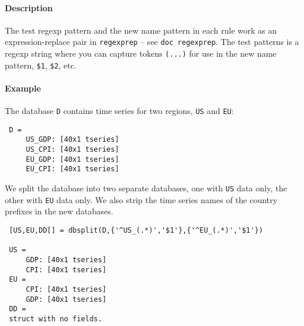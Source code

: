  \paragraph{Description}
 
 The test regexp pattern and the new name pattern in each rule work as an
 expression-replace pair in \texttt{regexprep} -- see
 \texttt{doc regexprep}. The test patterns is a regexp string where you
 can capture tokens \texttt{(...)} for use in the new name pattern,
 \texttt{\$1}, \texttt{\$2}, etc.
 
 \paragraph{Example}
 
 The database \texttt{D} contains time series for two regions,
 \texttt{US} and \texttt{EU}:
 
 \begin{verbatim}
 D = 
     US_GDP: [40x1 tseries]
     US_CPI: [40x1 tseries]
     EU_GDP: [40x1 tseries]
     EU_CPI: [40x1 tseries]
 \end{verbatim}
 
 We split the database into two separate databases, one with \texttt{US}
 data only, the other with \texttt{EU} data only. We also strip the time
 series names of the country prefixes in the new databases.
 
 \begin{verbatim}
 [US,EU,DD[] = dbsplit(D,{'^US_(.*)','$1'},{'^EU_(.*)','$1'})
 
 US = 
     GDP: [40x1 tseries]
     CPI: [40x1 tseries]
 EU = 
     CPI: [40x1 tseries]
     GDP: [40x1 tseries]
 DD = 
 struct with no fields.
 \end{verbatim}


